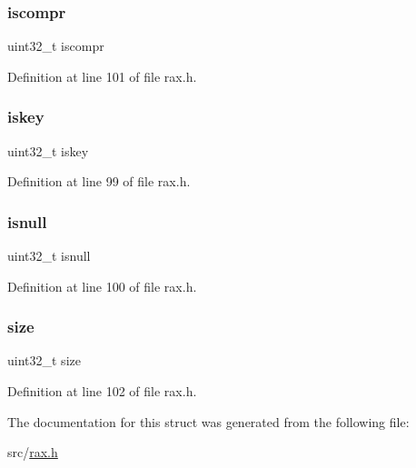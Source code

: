 \mbox{\label{structrax_node_a1b7f71444b8d20355b174737095f3e65}} 
\subsubsection{\texorpdfstring{iscompr}{iscompr}}
{\footnotesize\ttfamily uint32\+\_\+t iscompr}



Definition at line 101 of file rax.\+h.

\mbox{\label{structrax_node_ad11d2993e802c844bfdf827ebce7907d}} 
\subsubsection{\texorpdfstring{iskey}{iskey}}
{\footnotesize\ttfamily uint32\+\_\+t iskey}



Definition at line 99 of file rax.\+h.

\mbox{\label{structrax_node_a9301700c1338965475354cc876ccdf6f}} 
\subsubsection{\texorpdfstring{isnull}{isnull}}
{\footnotesize\ttfamily uint32\+\_\+t isnull}



Definition at line 100 of file rax.\+h.

\mbox{\label{structrax_node_ab2c6b258f02add8fdf4cfc7c371dd772}} 
\subsubsection{\texorpdfstring{size}{size}}
{\footnotesize\ttfamily uint32\+\_\+t size}



Definition at line 102 of file rax.\+h.



The documentation for this struct was generated from the following file\+:\begin{DoxyCompactItemize}
\item 
src/\hyperlink{rax_8h}{rax.\+h}\end{DoxyCompactItemize}
